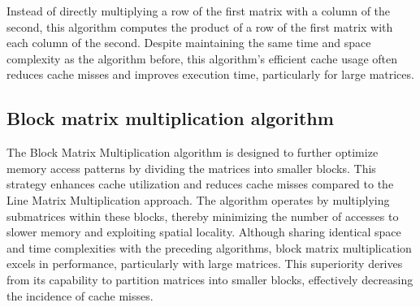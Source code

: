 Instead of directly multiplying a row of the
first matrix with a column of the second, this algorithm
computes the product of a row of the first
matrix with each column of the second. Despite maintaining the same time and space complexity as the algorithm before, this algorithm's
efficient cache usage often reduces cache misses and improves
execution time, particularly for large matrices.


\subsection{Block matrix multiplication algorithm}

The Block Matrix Multiplication algorithm is designed
to further optimize memory access patterns by dividing
the matrices into smaller blocks. This strategy enhances
cache utilization and reduces cache misses compared to the
Line Matrix Multiplication approach. The algorithm operates by
multiplying submatrices
within these blocks, thereby minimizing the number of accesses to slower memory
and exploiting spatial locality. Although
sharing identical space and time complexities with the preceding
algorithms, block matrix multiplication excels in performance,
particularly with large matrices. This superiority derives from its
capability to partition matrices into smaller blocks, effectively
decreasing the incidence of cache misses.